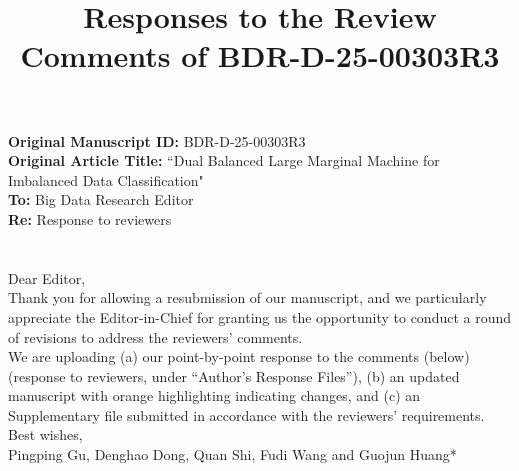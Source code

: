\documentclass[journal,12pt, onecolumn]{IEEEtran}
\begin{document}

\title{Responses to the Review Comments of BDR-D-25-00303R3}
\maketitle

\textbf{Original Manuscript ID: }BDR-D-25-00303R3 \\


\textbf{Original Article Title: }``Dual Balanced Large Marginal Machine for Imbalanced Data Classification" \\

\textbf{To: }Big Data Research Editor\\

\textbf{Re: }Response to reviewers\\

\section*{}
{
Dear Editor, \\

Thank you for allowing a resubmission of our manuscript, and we particularly appreciate the Editor-in-Chief for granting us the opportunity to conduct a round of revisions to address the reviewers’ comments.\\

We are uploading (a) our point-by-point response to the comments (below) (response to reviewers, under “Author’s Response Files”), (b) an updated manuscript with orange highlighting indicating changes, and (c) an Supplementary file submitted in accordance with the reviewers’ requirements.\\

Best wishes,\\

Pingping Gu, Denghao Dong, Quan Shi, Fudi Wang and Guojun Huang*}\\
\end{document}
